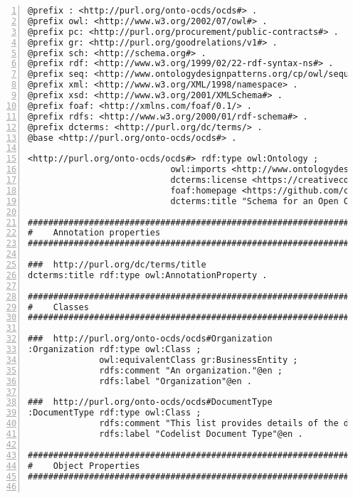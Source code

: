 
 \begin{lstlisting}[captionpos=b, caption={Extracto de código de la ontología OCDSPY}, label={lst:ocdspyAnexo},  numbers=left,  numberstyle=\tiny\color{mygray},frame=single, breaklines=true]
@prefix : <http://purl.org/onto-ocds/ocds#> .
@prefix owl: <http://www.w3.org/2002/07/owl#> .
@prefix pc: <http://purl.org/procurement/public-contracts#> .
@prefix gr: <http://purl.org/goodrelations/v1#> .
@prefix sch: <http://schema.org#> .
@prefix rdf: <http://www.w3.org/1999/02/22-rdf-syntax-ns#> .
@prefix seq: <http://www.ontologydesignpatterns.org/cp/owl/sequence.owl#> .
@prefix xml: <http://www.w3.org/XML/1998/namespace> .
@prefix xsd: <http://www.w3.org/2001/XMLSchema#> .
@prefix foaf: <http://xmlns.com/foaf/0.1/> .
@prefix rdfs: <http://www.w3.org/2000/01/rdf-schema#> .
@prefix dcterms: <http://purl.org/dc/terms/> .
@base <http://purl.org/onto-ocds/ocds#> .

<http://purl.org/onto-ocds/ocds#> rdf:type owl:Ontology ;
                            owl:imports <http://www.ontologydesignpatterns.org/cp/owl/sequence.owl> ;
                            dcterms:license <https://creativecommons.org/licenses/by/2.0/> ;
                            foaf:homepage <https://github.com/camilobaezcamba/open-contracting-ld> ;
                            dcterms:title "Schema for an Open Contracting Release"@en .

#################################################################
#    Annotation properties
#################################################################

###  http://purl.org/dc/terms/title
dcterms:title rdf:type owl:AnnotationProperty .

#################################################################
#    Classes
#################################################################

###  http://purl.org/onto-ocds/ocds#Organization
:Organization rdf:type owl:Class ;
              owl:equivalentClass gr:BusinessEntity ;
              rdfs:comment "An organization."@en ;
              rdfs:label "Organization"@en .

###  http://purl.org/onto-ocds/ocds#DocumentType
:DocumentType rdf:type owl:Class ;
              rdfs:comment "This list provides details of the documents that publishers may wish to provide at various points their contracting process."@en ;
              rdfs:label "Codelist Document Type"@en .

#################################################################
#    Object Properties
#################################################################


\end{lstlisting}
